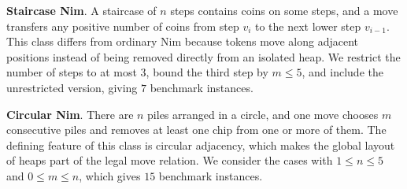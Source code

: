 \documentclass[review]{elsarticle}
\newcommand{\set}[1]{\{ #1 \}}
\newcommand{\tuple}[1]{\langle {#1} \rangle}
\newcommand{\true}{\top}
\newcommand{\statevar}{\mathcal{X}}
\newcommand{\act}{\mathcal{A}}
\newcommand{\constraint}{\mathcal{C}}
\newcommand{\estate}{\mathcal{E}}
\newcommand{\pre}{\mathtt{pre}}
\newcommand{\eff}{\mathtt{eff}}
\begin{document}
\textbf{Staircase Nim}. A staircase of $n$ steps contains coins on some steps, and a move transfers any positive number of coins from step $v_i$ to the next lower step $v_{i-1}$.
This class differs from ordinary Nim because tokens move along adjacent positions instead of being removed directly from an isolated heap.
We restrict the number of steps to at most $3$, bound the third step by $m \le 5$, and include the unrestricted version, giving $7$ benchmark instances.

\textbf{Circular Nim}. There are $n$ piles arranged in a circle, and one move chooses $m$ consecutive piles and removes at least one chip from one or more of them.
The defining feature of this class is circular adjacency, which makes the global layout of heaps part of the legal move relation.
We consider the cases with $1 \le n \le 5$ and $0 \le m \le n$, which gives $15$ benchmark instances.
\end{document}
